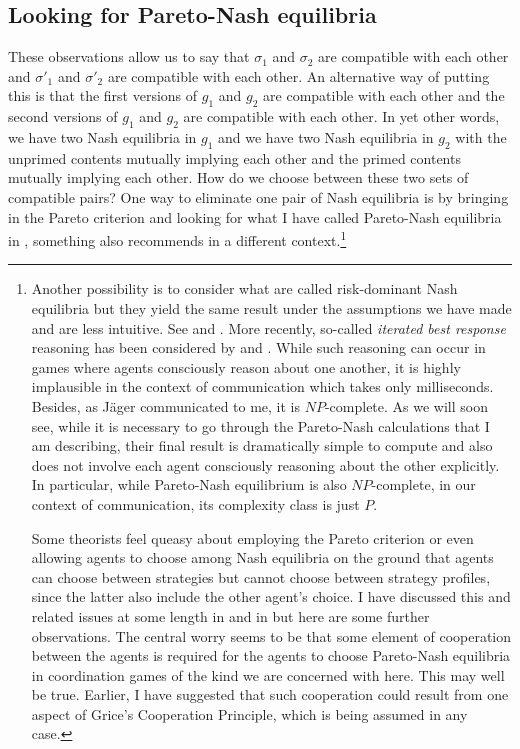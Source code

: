 \subsection{Looking for Pareto-Nash equilibria}

These observations allow us to say that $\sigma_1$ and $\sigma_2$ are compatible with each other and $\sigma'_1$ and $\sigma'_2$ are compatible with each other. An alternative way of putting this is that the first versions of $g_1$ and $g_2$ are compatible with each other and the second versions of $g_1$ and $g_2$ are compatible with each other. In yet other words, we have two Nash equilibria in $g_1$ and we have two Nash equilibria in $g_2$ with the unprimed contents mutually implying each other and the primed contents mutually implying each other. How do we choose between these two sets of compatible pairs? One way to eliminate one pair of Nash equilibria is by bringing in the Pareto criterion and looking for what I have called Pareto-Nash equilibria in , something \citet{spence:srism} also recommends in a different context.\footnote{Another possibility is to consider what are called risk-dominant Nash equilibria but they yield the same result under the assumptions we have made and are less intuitive. See \citet{hs:gtesg} and \citet[Section~3.3.5]{parikh:le}. More recently, so-called \emph{iterated best response} reasoning has been considered by \citet{franke:sa} and \citet{jager:gtsp}. While such reasoning can occur in games where agents consciously reason about one another, it is highly implausible in the context of communication which takes only milliseconds. Besides, as J\"{a}ger communicated to me, it is $NP$-complete. As we will soon see, while it is necessary to go through the Pareto-Nash calculations that I am describing, their final result is dramatically simple to compute and also does not involve each agent consciously reasoning about the other explicitly. In particular, while Pareto-Nash equilibrium is also $NP$-complete, in our context of communication, its complexity class is just $P$.

Some theorists feel queasy about employing the Pareto criterion or even allowing agents to choose among Nash equilibria on the ground that agents can choose between strategies but cannot choose between strategy profiles, since the latter also include the other agent's choice. I have discussed this and related issues at some length in \citet[footnote~9, pages~40--41]{parikh:ul} and in \citet[Section~3.3.5]{parikh:le} but here are some further observations. The central worry seems to be that some element of cooperation between the agents is required for the agents to choose Pareto-Nash equilibria in coordination games of the kind we are concerned with here. This may well be true. Earlier, I have suggested that such cooperation could result from one aspect of Grice's Cooperation Principle, which is being assumed in any case.

}
